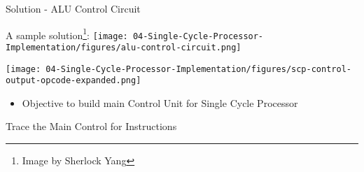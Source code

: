 
\ifnum{}
\begin{frame}{Solution - ALU Control Circuit}

A sample solution\footnote{Image by Sherlock Yang}:
\texttt{[image: 04-Single-Cycle-Processor-Implementation/figures/alu-control-circuit.png]}

\end{frame}
\fi

\begin{frame}[fragile]
\texttt{[image: 04-Single-Cycle-Processor-Implementation/figures/scp-control-output-opcode-expanded.png]}
\begin{itemize}
\item Objective to build main Control Unit for Single Cycle Processor
\end{itemize}
\end{frame}

\newpage
\begin{frame}{Trace the Main Control for Instructions}
\begin{center}
{\small
{}}
        \end{center}
    
\end{frame}


